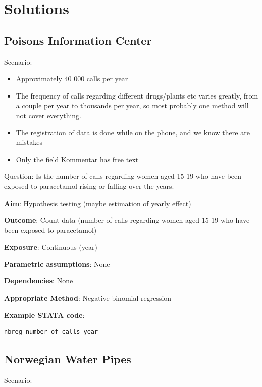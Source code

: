 \documentclass[12pt,]{article}
\providecommand{\tightlist}{%
  \setlength{\itemsep}{0pt}\setlength{\parskip}{0pt}}
\begin{document}
\section{Solutions}\label{solutions}

\subsection{Poisons Information
Center}\label{poisons-information-center-1}

Scenario:

\begin{itemize}
\tightlist
\item
  Approximately 40 000 calls per year
\item
  The frequency of calls regarding different drugs/plants etc varies
  greatly, from a couple per year to thousands per year, so most
  probably one method will not cover everything.
\item
  The registration of data is done while on the phone, and we know there
  are mistakes
\item
  Only the field Kommentar has free text
\end{itemize}

Question: Is the number of calls regarding women aged 15-19 who have
been exposed to paracetamol rising or falling over the years.

\textbf{Aim}: Hypothesis testing (maybe estimation of yearly effect)

\textbf{Outcome}: Count data (number of calls regarding women aged 15-19
who have been exposed to paracetamol)

\textbf{Exposure}: Continuous (year)

\textbf{Parametric assumptions}: None

\textbf{Dependencies}: None

\textbf{Appropriate Method}: Negative-binomial regression

\textbf{Example STATA code}:

\begin{verbatim}
nbreg number_of_calls year
\end{verbatim}

\subsection{Norwegian Water Pipes}\label{norwegian-water-pipes-1}

Scenario:
\end{document}
